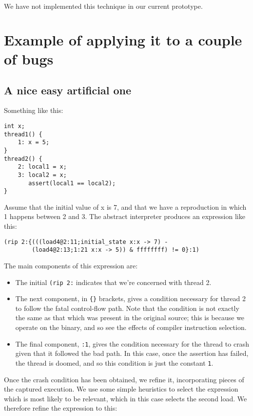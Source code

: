 \documentclass[10pt,a4paper]{report}
\begin{document}
We have not implemented this technique in our current prototype.

\section{Example of applying it to a couple of bugs}

\subsection{A nice easy artificial one}

Something like this:

\begin{verbatim}
int x;
thread1() {
    1: x = 5;
}
thread2() {
    2: local1 = x;
    3: local2 = x;
       assert(local1 == local2);
}
\end{verbatim}

Assume that the initial value of x is 7, and that we have a
reproduction in which 1 happens between 2 and 3.  The abstract
interpreter produces an expression like this:

\begin{verbatim}
(rip 2:{(((load4@2:11;initial_state x:x -> 7) -
        (load4@2:13;1:21 x:x -> 5)) & ffffffff) != 0}:1)
\end{verbatim}

The main components of this expression are:

\begin{itemize}
\item The initial \verb|(rip 2:| indicates that we're concerned with thread 2.
\item The next component, in \verb|{}| brackets, gives a condition
  necessary for thread 2 to follow the fatal control-flow path.  Note
  that the condition is not exactly the same as that which was present
  in the original source; this is because we operate on the binary,
  and so see the effects of compiler instruction selection.
\item The final component, \verb|:1|, gives the condition necessary
  for the thread to crash given that it followed the bad path.  In
  this case, once the assertion has failed, the thread is doomed, and
  so this condition is just the constant \verb|1|.
\end{itemize}

Once the crash condition has been obtained, we refine it,
incorporating pieces of the captured execution.  We use some simple
heuristics to select the expression which is most likely to be
relevant, which in this case selects the second load.  We therefore
refine the expression to this:
\end{document}
